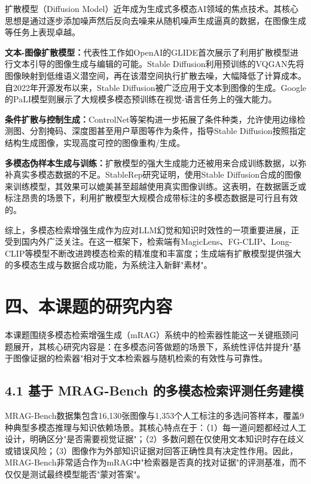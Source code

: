 \documentclass[12pt,a4paper]{article}
\begin{document}
扩散模型（Diffusion Model）近年成为生成式多模态AI领域的焦点技术。其核心思想是通过逐步添加噪声然后反向去噪来从随机噪声生成逼真的数据，在图像生成等任务上表现卓越。

\textbf{文本-图像扩散模型：}代表性工作如OpenAI的GLIDE首次展示了利用扩散模型进行文本引导的图像生成与编辑的可能\cite{nichol2022glide}。Stable Diffusion利用预训练的VQGAN先将图像映射到低维语义潜空间，再在该潜空间执行扩散去噪，大幅降低了计算成本\cite{rombach2022stable}。自2022年开源发布以来，Stable Diffusion被广泛应用于文本到图像的生成。Google的PaLI模型则展示了大规模多模态预训练在视觉-语言任务上的强大能力\cite{chen2022pali}。

\textbf{条件扩散与控制生成：}ControlNet等架构进一步拓展了条件种类，允许使用边缘检测图、分割掩码、深度图甚至用户草图等作为条件，指导Stable Diffusion按照指定结构生成图像，实现高度可控的图像重构/生成\cite{zhang2023controlnet}。

\textbf{多模态伪样本生成与训练：}扩散模型的强大生成能力还被用来合成训练数据，以弥补真实多模态数据的不足。StableRep研究证明，使用Stable Diffusion合成的图像来训练模型，其效果可以媲美甚至超越使用真实图像训练\cite{tian2023stablerep}。这表明，在数据匮乏或标注昂贵的场景下，利用扩散模型大规模合成带标注的多模态数据是可行且有效的。

综上，多模态检索增强生成作为应对LLM幻觉和知识时效性的一项重要进展，正受到国内外广泛关注。在这一框架下，检索端有MagicLens、FG-CLIP、Long-CLIP等模型不断改进跨模态检索的精准度和丰富度；生成端有扩散模型提供强大的多模态生成与数据合成功能，为系统注入新鲜"素材"\cite{mei2025multimodalrag,abootorabi2025ask}。

\section*{四、本课题的研究内容}

本课题围绕多模态检索增强生成（mRAG）系统中的检索器性能这一关键瓶颈问题展开，其核心研究内容是：在多模态问答做题的场景下，系统性评估并提升"基于图像证据的检索器"相对于文本检索器与随机检索的有效性与可靠性。

\subsection*{4.1 基于 MRAG-Bench 的多模态检索评测任务建模}

MRAG-Bench数据集包含16,130张图像与1,353个人工标注的多选问答样本，覆盖9种典型多模态推理与知识依赖场景\cite{hu2024mragbench}。其核心特点在于：（1）每一道问题都经过人工设计，明确区分"是否需要视觉证据"；（2）多数问题在仅使用文本知识时存在歧义或错误风险；（3）图像作为外部知识证据对回答正确性具有决定性作用。因此，MRAG-Bench非常适合作为mRAG中"检索器是否真的找对证据"的评测基准，而不仅仅是测试最终模型能否"蒙对答案"。
\end{document}
